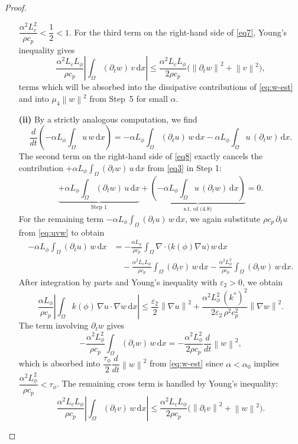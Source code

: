 \documentclass[10pt,a4paper]{amsart}
\newcommand{\abs}[1]{\left|#1\right|}
\newcommand{\dx}{\,\mathrm{d}x}
\newcommand{\norm}[1]{\left\|#1\right\|}
\newcommand{\ptn}{\partial_t}
\begin{document}
\begin{proof}
\begin{itemize}
			$\dfrac{\alpha^2 L_c^2}{\rho c_p} < \dfrac{1}{2} < 1$.
			For the third term on the right-hand side of \eqref{eq7}, Young's inequality gives
			\[
			\frac{\alpha^2 L_c L_\phi}{\rho c_p}
			\abs{\int_\Omega (\ptn w)\,v\dx}
			\leq
			\frac{\alpha^2 L_c L_\phi}{2\rho c_p}
			\bigl(\norm{\ptn w}^2 + \norm{v}^2\bigr),
			\]
			terms which will be absorbed into the dissipative contributions of
			\eqref{eq:w-est} and into $\mu_4\norm{w}^2$ from Step~5 for small $\alpha$.
			\item[\textbf{(ii)}]
			By a strictly analogous computation, we find
			\begin{equation}
				\label{eq8}
				\frac{d}{dt}\!\left(-\alpha L_\phi\int_\Omega u\,w\dx\right)
				= -\alpha L_\phi\int_\Omega (\ptn u)\,w\dx
				-\alpha L_\phi\int_\Omega u\,(\ptn w)\dx.
			\end{equation}
			The second term on the right-hand side of \eqref{eq8} exactly cancels the contribution
			$+\alpha L_\phi\int_\Omega (\ptn w)\,u\dx$ from \eqref{eq3} in Step 1:
			\[
			\underbrace{+\alpha L_\phi\int_\Omega (\ptn w)\,u\dx}_{\text{Step 1}}
			+
			\underbrace{\left( -\alpha L_\phi\int_\Omega u\,(\ptn w)\dx \right)}_{\text{s.t. of (4.8)}}
			= 0.
			\]
			For the remaining term $-\alpha L_\phi\int_\Omega (\ptn u)\,w\dx$,
			we again substitute $\rho c_p\,\ptn u$ from \eqref{eq:uvw} to obtain
			\begin{align*}
				-\alpha L_\phi\int_\Omega (\ptn u)\,w\dx
				&= -\frac{\alpha L_\phi}{\rho c_p}
				\int_\Omega \nabla\cdot\bigl(k(\phi)\nabla u\bigr)\,w\dx \\
				&\quad
				-\frac{\alpha^2 L_c L_\phi}{\rho c_p}
				\int_\Omega (\ptn v)\,w\dx
				-\frac{\alpha^2 L_\phi^2}{\rho c_p}
				\int_\Omega (\ptn w)\,w\dx.
			\end{align*}
			After integration by parts and Young's inequality with
			$\varepsilon_2 > 0$, we obtain
			\[
			\frac{\alpha L_\phi}{\rho c_p}
			\abs{\int_\Omega k(\phi)\,\nabla u\cdot\nabla w\dx}
			\leq
			\frac{\varepsilon_2}{2}\norm{\nabla u}^2
			+\frac{\alpha^2 L_\phi^2\,(k^*)^2}{2\varepsilon_2\,\rho^2 c_p^2}
			\norm{\nabla w}^2.
			\]
			The term involving $\ptn w$ gives
			\[
			-\frac{\alpha^2 L_\phi^2}{\rho c_p}
			\int_\Omega (\ptn w)\,w\dx
			= -\frac{\alpha^2 L_\phi^2}{2\rho c_p}\frac{d}{dt}\norm{w}^2,
			\]
			which is absorbed into $\dfrac{\tau_\phi}{2}\dfrac{d}{dt}\norm{w}^2$ from
			\eqref{eq:w-est} since $\alpha < \alpha_0$ implies
			$\dfrac{\alpha^2 L_\phi^2}{\rho c_p} < \tau_\phi$.
			The remaining cross term is handled by Young's inequality:
			\[
			\frac{\alpha^2 L_c L_\phi}{\rho c_p}
			\abs{\int_\Omega (\ptn v)\,w\dx}
			\leq
			\frac{\alpha^2 L_c L_\phi}{2\rho c_p}
			\bigl(\norm{\ptn v}^2 + \norm{w}^2\bigr).
			\]
			

\end{itemize}
\end{proof}
\end{document}
